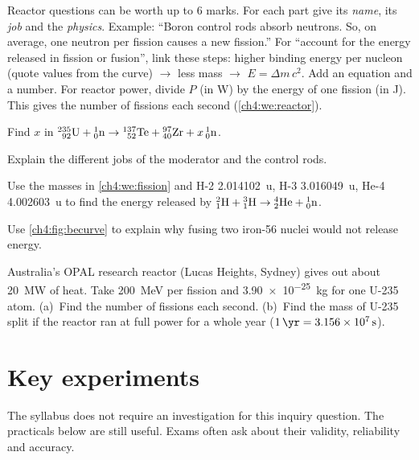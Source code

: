 \begin{examtip}
Reactor questions can be worth up to 6 marks. For each part give its \emph{name}, its
\emph{job} and the \emph{physics}. Example: ``Boron control rods absorb neutrons. So, on
average, one neutron per fission causes a new fission.''
For ``account for the energy released in fission or fusion'', link these steps:
higher binding energy per nucleon (quote values from the curve) $\to$ less mass $\to$
$E = \Delta m\, c^2$. Add an equation and a number.
For reactor power, divide $P$ (in W) by the energy of one fission (in J). This gives the
number of fissions each second (\cref{ch4:we:reactor}).
\end{examtip}

\begin{quickcheck}
  \item Find $x$ in $\chFourNuc{235}{92}{U} + \chFourNeut \to \chFourNuc{137}{52}{Te} +
        \chFourNuc{97}{40}{Zr} + x\,\chFourNeut$.
  \item Explain the different jobs of the moderator and the control rods.
  \item Use the masses in \cref{ch4:we:fission} and H-2 \qty{2.014102}{\amu},
        H-3 \qty{3.016049}{\amu}, He-4 \qty{4.002603}{\amu} to find the energy released
        by $\chFourNuc{2}{1}{H} + \chFourNuc{3}{1}{H} \to \chFourAlpha + \chFourNeut$.
  \item Use \cref{ch4:fig:becurve} to explain why fusing two iron-56 nuclei would not
        release energy.
  \item Australia's OPAL research reactor (Lucas Heights, Sydney) gives out about
        \qty{20}{MW} of heat. Take \qty{200}{MeV} per fission and \qty{3.90e-25}{kg}
        for one U-235 atom. (a)~Find the number of fissions each second. (b)~Find the
        mass of U-235 split if the reactor ran at full power for a whole year
        ($\qty{1}{\yr} = \qty{3.156e7}{s}$).
\end{quickcheck}

\section{Key experiments}\label{ch4:sec:experiments}

The syllabus does not require an investigation for this inquiry question. The
practicals below are still useful. Exams often ask about their validity, reliability
and accuracy.

